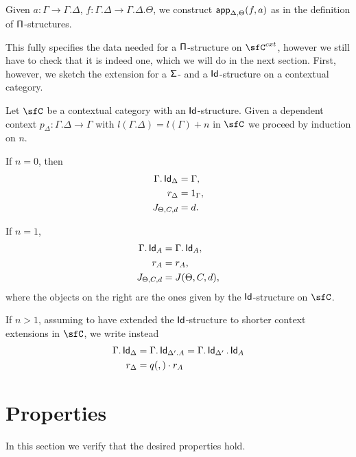 Given $a\colon\Gamma\rightarrow\Gamma.\Delta$,
$f\colon\Gamma.\Delta\rightarrow\Gamma.\Delta.\Theta$, we construct
$\operatorname{\mathsf{app}}_{\Delta,\Theta}(f,a)$ as in the definition of $\operatorname{\mathsf{\Pi}}$-structures.

This fully specifies the data needed for a $\operatorname{\mathsf{\Pi}}$-structure on $\sfC^{cxt}$,
however we still have to check that it is indeed one, which we will do in the
next section. First, however, we sketch the extension for a $\operatorname{\mathsf{\Sigma}}$- and a
$\operatorname{\mathsf{Id}}$-structure on a contextual category.

\begin{construction}
  Let $\sfC$ be a contextual category with an $\operatorname{\mathsf{Id}}$-structure. Given a dependent
  context $p_\Delta\colon\Gamma.\Delta\rightarrow\Gamma$ with
  $l(\Gamma.\Delta)=l(\Gamma)+n$ in $\sfC$ we proceed by induction on $n$.

  If $n=0$, then
  \begin{align*}
    \Gamma.\operatorname{\mathsf{Id}}_\Delta &=\Gamma, \\
    r_\Delta &=1_\Gamma, \\
    J_{\Theta,C,d} &=d.
  \end{align*}

  If $n=1$,
  \begin{align*}
    \Gamma.\operatorname{\mathsf{Id}}_A &=\Gamma.\operatorname{\mathsf{Id}}_A, \\
    r_A &=r_A, \\
    J_{\Theta,C,d} &=J(\Theta,C,d),
  \end{align*}
  where the objects on the right are the ones given by the $\operatorname{\mathsf{Id}}$-structure on
  $\sfC$.

  If $n>1$, assuming to have extended the $\operatorname{\mathsf{Id}}$-structure to shorter context
  extensions in $\sfC$, we write instead
  \begin{align*}
    \Gamma.\operatorname{\mathsf{Id}}_{\Delta} &=\Gamma.\operatorname{\mathsf{Id}}_{\Delta'.A}=\Gamma.\operatorname{\mathsf{Id}}_{\Delta'}.\operatorname{\mathsf{Id}}_A \\
    r_{\Delta} &= q(,)\cdot r_A
  \end{align*}
\end{construction}


\section{Properties}

In this section we verify that the desired properties hold.

